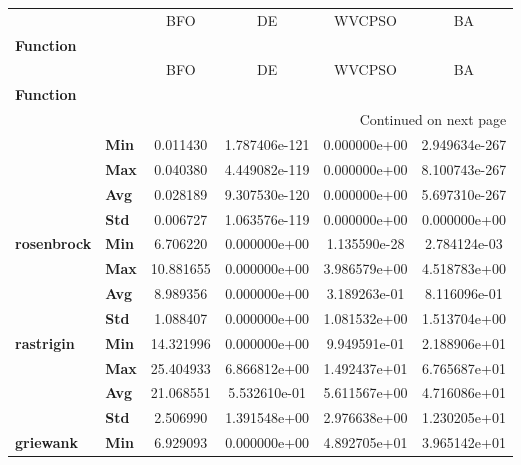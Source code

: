 \begin{longtable}{llcccc}
\toprule
            &     &          BFO &             DE &        WVCPSO &             BA \\
\textbf{Function} & {} &              &                &               &                \\
\midrule
\endfirsthead

\toprule
            &     &          BFO &             DE &        WVCPSO &             BA \\
\textbf{Function} & {} &              &                &               &                \\
\midrule
\endhead
\midrule
\multicolumn{6}{r}{{Continued on next page}} \\
\midrule
\endfoot

\bottomrule
\endlastfoot
\multirow{4}{*}{\textbf{sphere}} & \textbf{Min} &     0.011430 &  1.787406e-121 &  0.000000e+00 &  2.949634e-267 \\
            & \textbf{Max} &     0.040380 &  4.449082e-119 &  0.000000e+00 &  8.100743e-267 \\
            & \textbf{Avg} &     0.028189 &  9.307530e-120 &  0.000000e+00 &  5.697310e-267 \\
            & \textbf{Std} &     0.006727 &  1.063576e-119 &  0.000000e+00 &   0.000000e+00 \\
\cline{1-6}
\multirow{4}{*}{\textbf{rosenbrock}} & \textbf{Min} &     6.706220 &   0.000000e+00 &  1.135590e-28 &   2.784124e-03 \\
            & \textbf{Max} &    10.881655 &   0.000000e+00 &  3.986579e+00 &   4.518783e+00 \\
            & \textbf{Avg} &     8.989356 &   0.000000e+00 &  3.189263e-01 &   8.116096e-01 \\
            & \textbf{Std} &     1.088407 &   0.000000e+00 &  1.081532e+00 &   1.513704e+00 \\
\cline{1-6}
\multirow{4}{*}{\textbf{rastrigin}} & \textbf{Min} &    14.321996 &   0.000000e+00 &  9.949591e-01 &   2.188906e+01 \\
            & \textbf{Max} &    25.404933 &   6.866812e+00 &  1.492437e+01 &   6.765687e+01 \\
            & \textbf{Avg} &    21.068551 &   5.532610e-01 &  5.611567e+00 &   4.716086e+01 \\
            & \textbf{Std} &     2.506990 &   1.391548e+00 &  2.976638e+00 &   1.230205e+01 \\
\cline{1-6}
\multirow{4}{*}{\textbf{griewank}} & \textbf{Min} &     6.929093 &   0.000000e+00 &  4.892705e+01 &   3.965142e+01 \\

\end{longtable}
